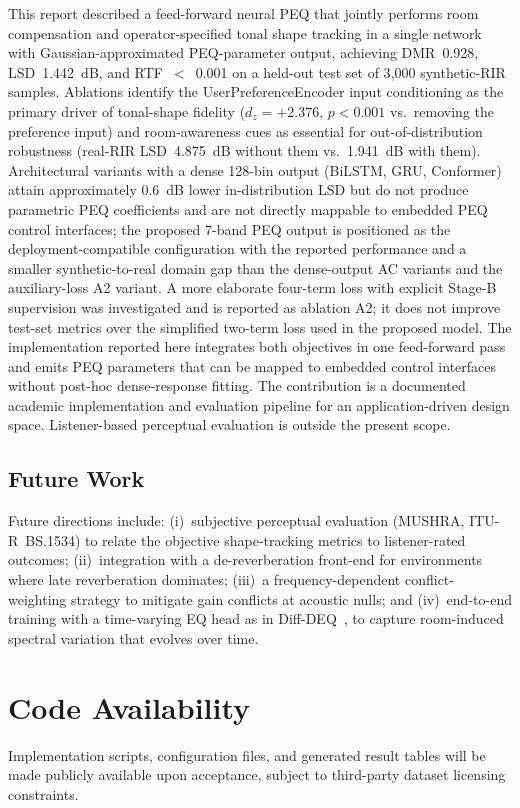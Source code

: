\documentclass{aes2e}
\begin{document}
This report described a feed-forward neural PEQ that jointly performs
room compensation and operator-specified tonal shape tracking in a
single network with Gaussian-approximated PEQ-parameter output,
achieving DMR~0.928, LSD~1.442~dB, and RTF~$<$~0.001 on a held-out test set of 3{,}000
synthetic-RIR samples.
Ablations identify the UserPreferenceEncoder input conditioning as the
primary driver of tonal-shape fidelity ($d_z = +2.376$, $p < 0.001$ vs.\
removing the preference input) and room-awareness cues as essential
for out-of-distribution robustness (real-RIR LSD~4.875~dB without them
vs.\ 1.941~dB with them).
Architectural variants with a dense 128-bin output (BiLSTM, GRU,
Conformer) attain approximately 0.6~dB lower in-distribution LSD but
do not produce parametric PEQ coefficients and are not directly
mappable to embedded PEQ control interfaces; the proposed 7-band PEQ
output is positioned as the deployment-compatible configuration with
the reported performance and a smaller synthetic-to-real domain gap than
the dense-output AC variants and the auxiliary-loss A2 variant.
A more elaborate four-term loss with explicit Stage-B supervision was
investigated and is reported as ablation A2; it does not improve
test-set metrics over the simplified two-term loss used in the proposed
model.
The implementation reported here integrates both objectives in one
feed-forward pass and emits PEQ parameters that can be mapped to embedded
control interfaces without post-hoc dense-response fitting.
The contribution is a documented academic implementation and evaluation
pipeline for an application-driven design space.
Listener-based perceptual evaluation is outside the present scope.


\subsection*{Future Work}

Future directions include: (i)~subjective perceptual evaluation
(MUSHRA, ITU-R~BS.1534) to relate the objective shape-tracking metrics
to listener-rated outcomes; (ii)~integration with a de-reverberation
front-end for environments where late reverberation dominates;
(iii)~a frequency-dependent conflict-weighting strategy to
mitigate gain conflicts at acoustic nulls; and (iv)~end-to-end
training with a time-varying EQ head as in Diff-DEQ~\cite{sarkar2025},
to capture room-induced spectral variation that evolves over time.



\section*{Code Availability}
Implementation scripts, configuration files, and generated result tables
will be made publicly available upon acceptance, subject to third-party
dataset licensing constraints.
\end{document}
